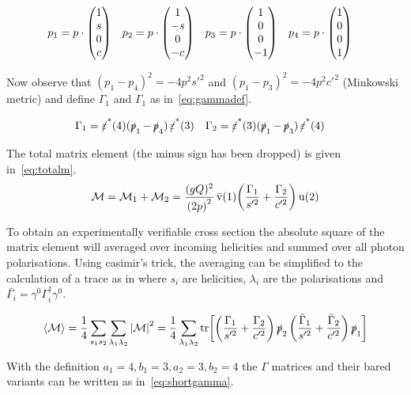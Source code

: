 \begin{align}
  \label{eq:pchoice}
  p_1&=p\cdot\mqty(1 \\ s \\ 0 \\ c)
     & p_2&=p\cdot\mqty(1 \\ -s \\ 0 \\ -c)
     & p_3&=p\cdot\mqty(1 \\ 0 \\ 0 \\ -1)
     & p_4&=p\cdot\mqty(1 \\ 0 \\ 0 \\ 1)
\end{align}

Now observe that \((p_1-p_4)^2=-4p^2s'^2\) and
\((p_1-p_3)^2=-4p^2c'^2\) (Minkowski metric) and define \(\Gamma_1\)
and \(\Gamma_1\) as in~\eqref{eq:gammadef}.

\begin{align}
  \label{eq:gammadef}
  \Gamma_1 &= \pses(4)(\ps_1 - \ps_4)\pses(3) &
  \Gamma_2 &= \pses(3)(\ps_1 - \ps_3)\pses(4)
\end{align}

The total matrix element (the minus sign has been dropped) is given in~\eqref{eq:totalm}.
\begin{equation}
  \label{eq:totalm}
  \mathcal{M} = \mathcal{M}_1 + \mathcal{M}_2 = \frac{(gQ)^2}{\qty(2p)^2}\operatorname{\bar{v}}(1)\qty(\frac{\Gamma_1}{s'^2}+\frac{\Gamma_2}{c'^2})\operatorname{u}(2)
\end{equation}

To obtain an experimentally verifiable cross section the absolute square of the
matrix element will averaged over incoming helicities and summed over
all photon polarisations.  Using casimir's trick, the averaging can be
simplified to the calculation of a trace as in where \(s_i\) are
helicities, \(\lambda_i\) are the polarisations and \(\bar{\Gamma_i}=\gamma^0\Gamma^\dagger_i\gamma^0\).

\begin{equation}
  \label{eq:averagedm}
  \langle\mathcal{M}\rangle = \frac{1}{4}\sum_{s_1 s_2}\sum_{\lambda_1
    \lambda_2} \abs{\mathcal{M}}^2=\frac{1}{4}\sum_{\lambda_1
    \lambda_2}\tr[\qty(\frac{\Gamma_1}{s'^2}+\frac{\Gamma_2}{c'^2})
  \operatorname{\slashed{p}}_2\qty(\frac{\bar{\Gamma}_1}{s'^2}+\frac{\bar{\Gamma}_2}{c'^2})\operatorname{\slashed{p}}_1]
\end{equation}

With the definition \(a_1=4,b_1=3,a_2=3,b_2=4\) the \(\Gamma\)
matrices and their bared variants can be written as in~\eqref{eq:shortgamma}.

